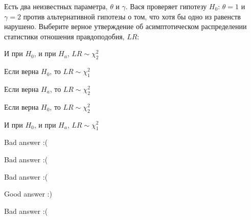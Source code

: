 
\begin{question}
Есть два неизвестных параметра, \(\theta\) и \(\gamma\). Вася проверяет
гипотезу \(H_0\): \(\theta = 1\) и \(\gamma = 2\) против альтернативной
гипотезы о том, что хотя бы одно из равенств нарушено. Выберите верное
утверждение об асимптотическом распределении статистики отношения
правдоподобия, \(LR\):
\begin{answerlist}
  \item И при \(H_0\), и при \(H_a\), \(LR \sim \chi_2^2\)
  \item Если верна \(H_0\), то \(LR \sim \chi_1^2\)
  \item Если верна \(H_a\), то \(LR \sim \chi_2^2\)
  \item Если верна \(H_0\), то \(LR \sim \chi_2^2\)
  \item И при \(H_0\), и при \(H_a\), \(LR \sim \chi_1^2\)
\end{answerlist}
\end{question}

\begin{solution}
\begin{answerlist}
  \item Bad answer :(
  \item Bad answer :(
  \item Bad answer :(
  \item Good answer :)
  \item Bad answer :(
\end{answerlist}
\end{solution}

